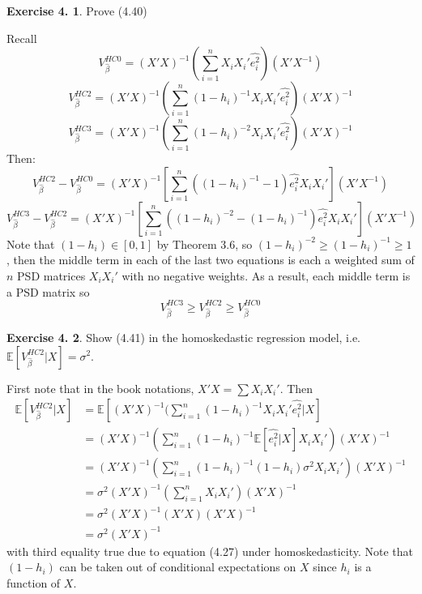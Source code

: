 \documentclass[12pt,letterpaper,reqno]{amsart}
\newcommand{\E}{\mathbb E}
\theoremstyle{plain}
\theoremstyle{definition}
\theoremstyle{definition}
\newtheorem{Exercise}{Exercise 4.}
\numberwithin{equation}{section}
\begin{document}
\begin{Exercise} Prove (4.40)

    Recall
    \[
    V_{\hat{\beta}}^{HC0} = (X'X)^{-1} (\sum_{i=1}^n X_iX_i' \widehat{e_i^2} ) (X'X^{-1}) 
    \]
    \[
    V_{\hat{\beta}}^{HC2} = (X'X)^{-1} (\sum_{i=1}^n (1-h_i)^{-1} X_iX_i' \widehat{e_i^2} ) (X'X)^{-1}
    \]
    \[
    V_{\hat{\beta}}^{HC3} = (X'X)^{-1} (\sum_{i=1}^n (1-h_i)^{-2} X_iX_i' \widehat{e_i^2} ) (X'X)^{-1}
    \]
    Then:
    \[
    V_{\hat{\beta}}^{HC2} - V_{\hat{\beta}}^{HC0} = (X'X)^{-1} [\sum_{i=1}^n ((1-h_i)^{-1} - 1) \widehat{e_i^2} X_iX_i' ] (X'X^{-1}) 
    \]
    \[
    V_{\hat{\beta}}^{HC3} - V_{\hat{\beta}}^{HC2} = (X'X)^{-1} [\sum_{i=1}^n ((1-h_i)^{-2} - (1-h_i)^{-1} ) \widehat{e_i^2} X_iX_i' ] (X'X^{-1}) 
    \]
    Note that $(1-h_i) \in [0,1] $ by Theorem 3.6, so $ (1-h_i)^{-2} \geqslant (1-h_i)^{-1} \geqslant 1 $, then the middle term in each of the last two equations is each a weighted sum of $n$ PSD matrices $X_iX_i'$ with no negative weights. As a result, each middle term is a PSD matrix so 
    \[
    V_{\hat{\beta}}^{HC3} \geqslant V_{\hat{\beta}}^{HC2} \geqslant V_{\hat{\beta}}^{HC0}
    \]
\end{Exercise} 

\begin{Exercise} Show (4.41) in the homoskedastic regression model, i.e. $\E[V_{\hat{\beta}}^{HC2}|X] = \sigma^2$.

    First note that in the book notations, $X'X= \sum X_iX_i'$. Then
    \[\begin{split}
            \E[V_{\hat{\beta}}^{HC2}|X] & = \E[(X'X)^{-1} (\sum_{i=1}^n (1-h_i)^{-1} X_iX_i' \widehat{e_i^2} |X] \\
            & = (X'X)^{-1} ( \sum_{i=1}^n (1-h_i)^{-1} \E[\widehat{e_i^2}|X] X_iX_i' ) (X'X)^{-1} \\
            & = (X'X)^{-1} ( \sum_{i=1}^n (1-h_i)^{-1} (1-h_i) \sigma^2 X_iX_i' ) (X'X)^{-1} \\
            & = \sigma^2 (X'X)^{-1} ( \sum_{i=1}^n  X_iX_i' ) (X'X)^{-1} \\ 
            & = \sigma^2 (X'X)^{-1} (X'X) (X'X)^{-1} \\
            & = \sigma^2 (X'X)^{-1}
    \end{split}\]
    with third equality true due to equation (4.27) under homoskedasticity. Note that $(1-h_i)$ can be taken out of conditional expectations on $X$ since $h_i$ is a function of $X$.
\end{Exercise}
\end{document}

